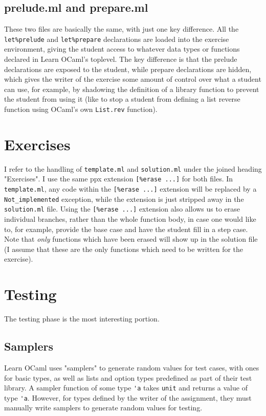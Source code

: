 \documentclass[11pt]{article}
\begin{document}
\subsection{prelude.ml and prepare.ml}
These two files are basically the same, with just one key difference. All the \verb+let%prelude+ and \verb+let%prepare+ declarations are loaded into the exercise environment, giving the student access to whatever data types or functions declared in Learn OCaml's toplevel. The key difference is that the prelude declarations are exposed to the student, while prepare declarations are hidden, which gives the writer of the exercise some amount of control over what a student can use, for example, by shadowing the definition of a library function to prevent the student from using it (like to stop a student from defining a list reverse function using OCaml's own \verb+List.rev+ function).

\section{Exercises}
I refer to the handling of \verb+template.ml+ and \verb+solution.ml+ under the joined heading "Exercises". I use the same ppx extension \verb+[%erase ...]+ for both files. In \verb+template.ml+, any code within the \verb+[%erase ...]+ extension will be replaced by a \verb+Not_implemented+ exception, while the extension is just stripped away in the \verb+solution.ml+ file. Using the \verb+[%erase ...]+ extension also allows us to erase individual branches, rather than the whole function body, in case one would like to, for example, provide the base case and have the student fill in a step case. Note that \textit{only} functions which have been erased will show up in the solution file (I assume that these are the only functions which need to be written for the exercise).

\section{Testing}
The testing phase is the most interesting portion.

\subsection{Samplers}
Learn OCaml uses "samplers" to generate random values for test cases, with ones for basic types, as well as lists and option types predefined as part of their test library. A sampler function of some type \verb+'a+ takes \verb+unit+ and returns a value of type \verb+'a+. However, for types defined by the writer of the assignment, they must manually write samplers to generate random values for testing.
\end{document}
